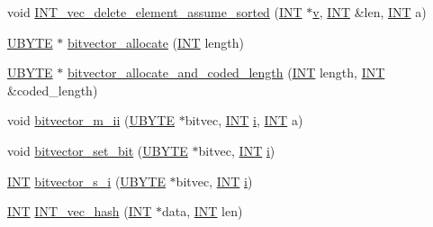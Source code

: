 \begin{DoxyCompactItemize}
\item 
void \mbox{\hyperlink{util_8_c_a77c3ce15fd68479344b6b6e4fd35c48b}{I\+N\+T\+\_\+vec\+\_\+delete\+\_\+element\+\_\+assume\+\_\+sorted}} (\mbox{\hyperlink{galois_8h_a09fddde158a3a20bd2dcadb609de11dc}{I\+NT}} $\ast$\mbox{\hyperlink{simeon_8_c_aeb3f3030944801b163bc3b829a7f6710}{v}}, \mbox{\hyperlink{galois_8h_a09fddde158a3a20bd2dcadb609de11dc}{I\+NT}} \&len, \mbox{\hyperlink{galois_8h_a09fddde158a3a20bd2dcadb609de11dc}{I\+NT}} a)
\item 
\mbox{\hyperlink{galois_8h_a122c4acf389c050379f00341fdcd5812}{U\+B\+Y\+TE}} $\ast$ \mbox{\hyperlink{util_8_c_a29983d19d007af9bedbb5e3f8981fd6c}{bitvector\+\_\+allocate}} (\mbox{\hyperlink{galois_8h_a09fddde158a3a20bd2dcadb609de11dc}{I\+NT}} length)
\item 
\mbox{\hyperlink{galois_8h_a122c4acf389c050379f00341fdcd5812}{U\+B\+Y\+TE}} $\ast$ \mbox{\hyperlink{util_8_c_a71c00a15bba415dad4d3db0efbacc79d}{bitvector\+\_\+allocate\+\_\+and\+\_\+coded\+\_\+length}} (\mbox{\hyperlink{galois_8h_a09fddde158a3a20bd2dcadb609de11dc}{I\+NT}} length, \mbox{\hyperlink{galois_8h_a09fddde158a3a20bd2dcadb609de11dc}{I\+NT}} \&coded\+\_\+length)
\item 
void \mbox{\hyperlink{util_8_c_a31da55e2b26316d582cd322dc670b67b}{bitvector\+\_\+m\+\_\+ii}} (\mbox{\hyperlink{galois_8h_a122c4acf389c050379f00341fdcd5812}{U\+B\+Y\+TE}} $\ast$bitvec, \mbox{\hyperlink{galois_8h_a09fddde158a3a20bd2dcadb609de11dc}{I\+NT}} \mbox{\hyperlink{alphabet2_8_c_acb559820d9ca11295b4500f179ef6392}{i}}, \mbox{\hyperlink{galois_8h_a09fddde158a3a20bd2dcadb609de11dc}{I\+NT}} a)
\item 
void \mbox{\hyperlink{util_8_c_aea2585c3a9817547809788e3c42ff8a0}{bitvector\+\_\+set\+\_\+bit}} (\mbox{\hyperlink{galois_8h_a122c4acf389c050379f00341fdcd5812}{U\+B\+Y\+TE}} $\ast$bitvec, \mbox{\hyperlink{galois_8h_a09fddde158a3a20bd2dcadb609de11dc}{I\+NT}} \mbox{\hyperlink{alphabet2_8_c_acb559820d9ca11295b4500f179ef6392}{i}})
\item 
\mbox{\hyperlink{galois_8h_a09fddde158a3a20bd2dcadb609de11dc}{I\+NT}} \mbox{\hyperlink{util_8_c_ac0135a3681a44df3fe7af1545676fbe2}{bitvector\+\_\+s\+\_\+i}} (\mbox{\hyperlink{galois_8h_a122c4acf389c050379f00341fdcd5812}{U\+B\+Y\+TE}} $\ast$bitvec, \mbox{\hyperlink{galois_8h_a09fddde158a3a20bd2dcadb609de11dc}{I\+NT}} \mbox{\hyperlink{alphabet2_8_c_acb559820d9ca11295b4500f179ef6392}{i}})
\item 
\mbox{\hyperlink{galois_8h_a09fddde158a3a20bd2dcadb609de11dc}{I\+NT}} \mbox{\hyperlink{util_8_c_a2c14b1034b07b03b4df943066edeb99f}{I\+N\+T\+\_\+vec\+\_\+hash}} (\mbox{\hyperlink{galois_8h_a09fddde158a3a20bd2dcadb609de11dc}{I\+NT}} $\ast$data, \mbox{\hyperlink{galois_8h_a09fddde158a3a20bd2dcadb609de11dc}{I\+NT}} len)

\end{DoxyCompactItemize}
